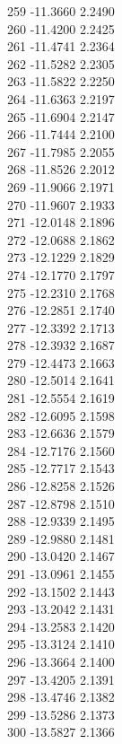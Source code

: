 \documentclass[11pt]{article}
\theoremstyle{definition}
\theoremstyle{plain}
\begin{document}
{259 -11.3660 2.2490\\
260 -11.4200 2.2425\\
261 -11.4741 2.2364\\
262 -11.5282 2.2305\\
263 -11.5822 2.2250\\
264 -11.6363 2.2197\\
265 -11.6904 2.2147\\
266 -11.7444 2.2100\\
267 -11.7985 2.2055\\
268 -11.8526 2.2012\\
269 -11.9066 2.1971\\
270 -11.9607 2.1933\\
271 -12.0148 2.1896\\
272 -12.0688 2.1862\\
273 -12.1229 2.1829\\
274 -12.1770 2.1797\\
275 -12.2310 2.1768\\
276 -12.2851 2.1740\\
277 -12.3392 2.1713\\
278 -12.3932 2.1687\\
279 -12.4473 2.1663\\
280 -12.5014 2.1641\\
281 -12.5554 2.1619\\
282 -12.6095 2.1598\\
283 -12.6636 2.1579\\
284 -12.7176 2.1560\\
285 -12.7717 2.1543\\
286 -12.8258 2.1526\\
287 -12.8798 2.1510\\
288 -12.9339 2.1495\\
289 -12.9880 2.1481\\
290 -13.0420 2.1467\\
291 -13.0961 2.1455\\
292 -13.1502 2.1443\\
293 -13.2042 2.1431\\
294 -13.2583 2.1420\\
295 -13.3124 2.1410\\
296 -13.3664 2.1400\\
297 -13.4205 2.1391\\
298 -13.4746 2.1382\\
299 -13.5286 2.1373\\
300 -13.5827 2.1366\\
}
\end{document}
